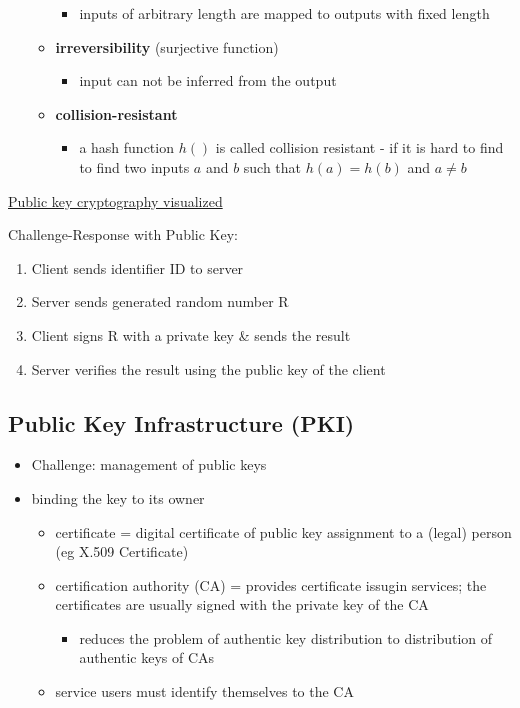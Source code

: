 \documentclass[11pt]{article}
\begin{document}
\begin{itemize}
\begin{itemize}
\begin{itemize}
\item inputs of arbitrary length are mapped to outputs with fixed length
\end{itemize}
\item \textbf{irreversibility} (surjective function)
\begin{itemize}
\item input can not be inferred from the output
\end{itemize}
\item \textbf{collision-resistant}
\begin{itemize}
\item a hash function \(h()\) is called collision resistant - if it is hard to find to find two inputs \(a\) and \(b\) such that \(h(a)=h(b)\) and \(a \neq b\)
\end{itemize}
\end{itemize}
\end{itemize}

\href{https://www.youtube.com/watch?v=YEBfamv-\_do\&feature=youtu.be}{Public key cryptography visualized}

Challenge-Response with Public Key:
\begin{enumerate}
\item Client sends identifier ID to server
\item Server sends generated random number R
\item Client signs R with a private key \& sends the result
\item Server verifies the result using the public key of the client
\end{enumerate}
\subsection{Public Key Infrastructure (PKI)}
\label{sec:org6a37fa7}
\begin{itemize}
\item Challenge: management of public keys
\item binding the key to its owner
\begin{itemize}
\item certificate = digital certificate of public key assignment to a (legal) person (eg X.509 Certificate)
\item certification authority (CA) = provides certificate issugin services; the certificates are usually signed with the private key of the CA
\begin{itemize}
\item reduces the problem of authentic key distribution to distribution of authentic keys of CAs
\end{itemize}
\item service users must identify themselves to the CA
\end{itemize}
\end{itemize}
\end{document}
